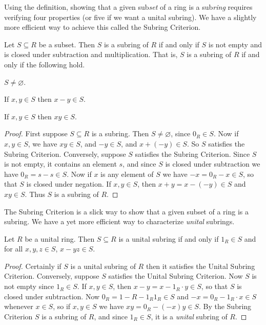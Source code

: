 Using the definition, showing that a given sub\emph{set} of a ring is a sub\emph{ring} requires verifying four properties (or five if we want a unital subring).
We have a slightly more efficient way to achieve this called the Subring Criterion.

\begin{prop} \label{prop:subring-criterion}
Let \(S \subseteq R\) be a subset.
Then \(S\) is a subring of \(R\) if and only if \(S\) is not empty and is closed under subtraction and multiplication.
That is, \(S\) is a subring of \(R\) if and only if the following hold.
\begin{proplist*}
\item \(S \neq \varnothing\).
\item If \(x,y \in S\) then \(x-y \in S\).
\item If \(x,y \in S\) then \(xy \in S\).
\end{proplist*}
\end{prop}

\begin{proof}
First suppose \(S \subseteq R\) is a subring.
Then \(S \neq \varnothing\), since \(0_R \in S\).
Now if \(x,y \in S\), we have \(xy \in S\), and \(-y \in S\), and \(x + (-y) \in S\).
So \(S\) satisfies the Subring Criterion.
Conversely, suppose \(S\) satisfies the Subring Criterion.
Since \(S\) is not empty, it contains an element \(s\), and since \(S\) is closed under subtraction we have \(0_R = s - s \in S\).
Now if \(x\) is any element of \(S\) we have \(-x = 0_R - x \in S\), so that \(S\) is closed under negation.
If \(x,y \in S\), then \(x+y = x-(-y) \in S\) and \(xy \in S\).
Thus \(S\) is a subring of \(R\).
\end{proof}

The Subring Criterion is a slick way to show that a given subset of a ring is a subring.
We have a yet more efficient way to characterize \emph{unital} subrings.

\begin{prop} \label{prop:unital-subring-criterion}
Let \(R\) be a unital ring.
Then \(S \subseteq R\) is a unital subring if and only if \(1_R \in S\) and for all \(x,y,z \in S\), \(x-yz \in S\).
\end{prop}

\begin{proof}
Certainly if \(S\) is a unital subring of \(R\) then it satisfies the Unital Subring Criterion.
Conversely, suppose \(S\) satisfies the Unital Subring Criterion.
Now \(S\) is not empty since \(1_R \in S\).
If \(x,y \in S\), then \(x-y = x - 1_R \cdot y \in S\), so that \(S\) is closed under subtraction.
Now \(0_R = 1-R - 1_R1_R \in S\) and \(-x = 0_R - 1_R \cdot x \in S\) whenever \(x \in S\), so if \(x,y \in S\) we have \(xy = 0_R - (-x)y \in S\).
By the Subring Criterion \(S\) is a subring of \(R\), and since \(1_R \in S\), it is a \emph{unital} subring of \(R\).
\end{proof}

